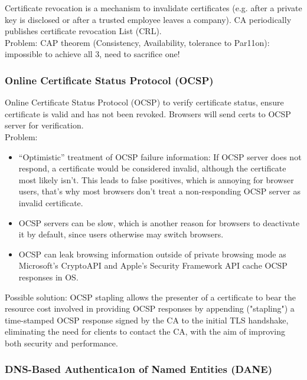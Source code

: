 \documentclass[11pt,oneside,a4paper]{article}
\begin{document}
Certificate revocation is a mechanism to invalidate certificates (e.g. after a private key is disclosed or after a trusted employee leaves a company). CA periodically publishes certificate revocation List (CRL).\\
Problem: CAP theorem (Consistency, Availability, tolerance to Par11on):
impossible to achieve all 3, need to sacrifice one!

\subsubsection{Online Certificate Status Protocol (OCSP)}

Online Certificate Status Protocol (OCSP) to verify certificate status, ensure certificate is valid and has not been revoked. Browsers will send certs to OCSP server for verification.\\
Problem: 
\vspace{-\topsep}
\begin{itemize}
	\setlength{\itemsep}{0pt}
	\setlength{\parskip}{0pt}
	\item “Optimistic” treatment of OCSP failure information: If OCSP server does not respond, a certificate would be considered invalid, although the certificate most likely isn't. This leads to false positives, which is annoying for browser users, that's why most browsers don't treat a non-responding OCSP server as invalid certificate.
	\item OCSP servers can be slow, which is another reason for browsers to deactivate it by default, since users otherwise may switch browsers.
	\item OCSP can leak browsing information outside of private browsing mode as Microsoft’s CryptoAPI and Apple’s Security Framework API cache OCSP responses in OS.
\end{itemize}
\vspace{-\topsep} 

\noindent Possible solution: OCSP stapling allows the presenter of a certificate to bear the resource cost involved in providing OCSP responses by appending ("stapling") a time-stamped OCSP response signed by the CA to the initial TLS handshake, eliminating the need for clients to contact the CA, with the aim of improving both security and performance.

\subsubsection{DNS-Based Authentica1on of Named Entities (DANE)}
\end{document}
